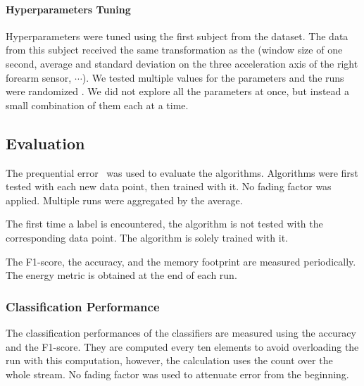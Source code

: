 \paragraph{Hyperparameters Tuning}
Hyperparameters were tuned using the first
subject from the \banosdataset dataset.  The data from
this subject received the same transformation as
the \banosdataset (window size of one second,
average and standard deviation on the three
acceleration axis of the right forearm sensor,
$\cdots$). We tested multiple values for the
parameters and the runs were randomized .  We did
not explore all the parameters at once, but
instead a small combination of them each at a
time.

\subsection{Evaluation}
The prequential error~\cite{issues_learning_from_stream} was used to evaluate the algorithms. 
Algorithms were first tested with each new data point, then trained with it. No fading factor
was applied. Multiple runs were aggregated by the average. 

The first time a label is encountered, the algorithm is not tested with the 
corresponding data point. The algorithm is solely trained with it. 

The F1-score, the accuracy, and the memory footprint are measured periodically.
The energy metric is obtained at the end of each run.

\subsubsection{Classification Performance}
The classification performances of the classifiers are measured using the
accuracy and the F1-score.  They are computed every ten elements to avoid
overloading the run with this computation, however, the calculation uses the
count over the whole stream. No fading factor was used to attenuate error from
the beginning.

